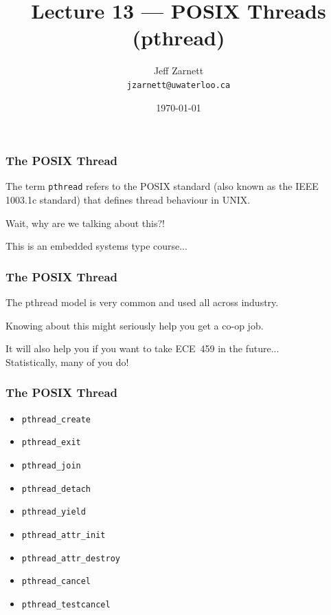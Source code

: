 

\title{Lecture 13 --- POSIX Threads (pthread) }

\author{Jeff Zarnett \\ \small \texttt{jzarnett@uwaterloo.ca}}
\date{\today}




\begin{frame}
	\titlepage

\end{frame}


\begin{frame}
	\frametitle{The POSIX Thread}

	The term \texttt{pthread} refers to the POSIX standard (also known as the IEEE 1003.1c standard) that defines thread behaviour in UNIX.

Wait, why are we talking about this?!

This is an embedded systems type course...

\end{frame}

\begin{frame}
	\frametitle{The POSIX Thread}

The pthread model is very common and used all across industry.

Knowing about this might seriously help you get a co-op job.


It will also help you if you want to take ECE~459 in the future...\\
\quad Statistically, many of you do! 

\end{frame}


\begin{frame}
	\frametitle{The POSIX Thread}
	\begin{itemize}
		\item \texttt{pthread\_create}
		\item \texttt{pthread\_exit}
		\item \texttt{pthread\_join}
		\item \texttt{pthread\_detach}
		\item \texttt{pthread\_yield}
		\item \texttt{pthread\_attr\_init}
		\item \texttt{pthread\_attr\_destroy}
		\item \texttt{pthread\_cancel}
		\item \texttt{pthread\_testcancel}
	\end{itemize}

\end{frame}


